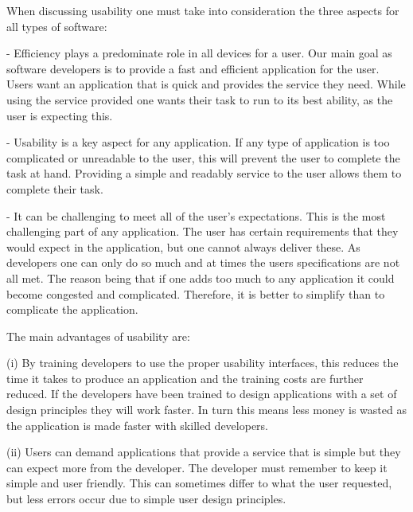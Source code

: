 \documentclass[runningheads,a4paper]{llncs}
\begin{document}
\begin{inparaenum}[]
When discussing usability one must take into consideration the three aspects for all types of software:
\end{inparaenum}

\begin{inparaenum}[]
- Efficiency plays a predominate role in all devices for a user. Our main goal as software developers is to provide a fast and efficient application for the user. Users want an application that is quick and provides the service they need. While using the service provided one wants their task to run to its best ability, as the user is expecting this.
\end{inparaenum}

\begin{inparaenum}[]
- Usability is a key aspect for any application. If any type of application is too complicated or unreadable to the user, this will prevent the user to complete the task at hand. Providing a simple and readably service to the user allows them to complete their task.
\end{inparaenum}

\begin{inparaenum}[]
- It can be challenging to meet all of the user’s expectations. This is the most challenging part of any application. The user has certain requirements that they would expect in the application, but one cannot always deliver these. As developers one can only do so much and at times the users specifications are not all met. The reason being that if one adds too much to any application it could become congested and complicated. Therefore, it is better to simplify than to complicate the application.
\end{inparaenum}

\begin{inparaenum}[]
The main advantages of usability are:
\end{inparaenum}

\begin{inparaenum}[]
(i)  By training developers to use the proper usability interfaces, this reduces the time it takes to produce an application and the training costs are further reduced. If the developers have been trained to design applications with a set of design principles they will work faster. In turn this means less money is wasted as the application is made faster with skilled developers.
\end{inparaenum}

\begin{inparaenum}[]
(ii) Users can demand applications that provide a service that is simple but they can expect more from the developer. The developer must remember to keep it simple and user friendly. This can sometimes differ to what the user requested, but less errors occur due to simple user design principles.
\end{inparaenum}
\end{document}

